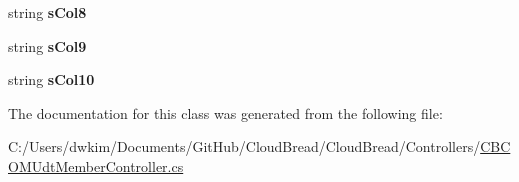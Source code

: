 \begin{DoxyCompactItemize}
\item 
string {\bfseries s\+Col8}\hypertarget{class_cloud_bread_1_1_controllers_1_1_c_b_c_o_m_udt_member_controller_1_1_input_params_af6fd531d6b7352b7d41dd9534ff53ec1}{}\label{class_cloud_bread_1_1_controllers_1_1_c_b_c_o_m_udt_member_controller_1_1_input_params_af6fd531d6b7352b7d41dd9534ff53ec1}

\item 
string {\bfseries s\+Col9}\hypertarget{class_cloud_bread_1_1_controllers_1_1_c_b_c_o_m_udt_member_controller_1_1_input_params_ae9a94dadcd0412cde0f331e151fd76e2}{}\label{class_cloud_bread_1_1_controllers_1_1_c_b_c_o_m_udt_member_controller_1_1_input_params_ae9a94dadcd0412cde0f331e151fd76e2}

\item 
string {\bfseries s\+Col10}\hypertarget{class_cloud_bread_1_1_controllers_1_1_c_b_c_o_m_udt_member_controller_1_1_input_params_a929616ab2325d593f98b3f3c9cf807e3}{}\label{class_cloud_bread_1_1_controllers_1_1_c_b_c_o_m_udt_member_controller_1_1_input_params_a929616ab2325d593f98b3f3c9cf807e3}

\end{DoxyCompactItemize}


The documentation for this class was generated from the following file\+:\begin{DoxyCompactItemize}
\item 
C\+:/\+Users/dwkim/\+Documents/\+Git\+Hub/\+Cloud\+Bread/\+Cloud\+Bread/\+Controllers/\hyperlink{_c_b_c_o_m_udt_member_controller_8cs}{C\+B\+C\+O\+M\+Udt\+Member\+Controller.\+cs}\end{DoxyCompactItemize}
